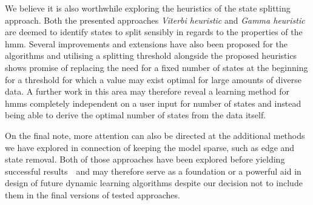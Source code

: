 We believe it is also worthwhile exploring the heuristics of the state splitting approach. Both the presented approaches \emph{Viterbi heuristic} and \emph{Gamma heuristic} are deemed to identify states to split sensibly in regards to the properties of the \gls{hmm}. Several improvements and extensions have also been proposed for the algorithms and utilising a splitting threshold alongside the proposed heuristics shows promise of replacing the need for a fixed number of states at the beginning for a threshold for which a value may exist optimal for large amounts of diverse data. A further work in this area may therefore reveal a learning method for \glspl{hmm} completely independent on a user input for number of states and instead being able to derive the optimal number of states from the data itself.

On the final note, more attention can also be directed at the additional methods we have explored in connection of keeping the model sparse, such as edge and state removal. Both of those approaches have been explored before yielding successful results~\cite{bicego2003, bicego2007}~and may therefore serve as a foundation or a powerful aid in design of future dynamic learning algorithms despite our decision not to include them in the final versions of tested approaches.